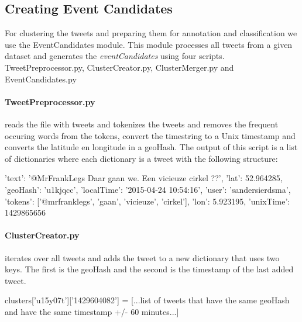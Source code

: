 \documentclass[
10pt, %
a4paper, %
oneside, %
headinclude,footinclude, %
BCOR5mm, %
]{scrartcl}
\begin{document}
\subsection{Creating Event Candidates}
For clustering the tweets and preparing them for annotation and classification we use the EventCandidates module. This module processes all tweets from a given dataset and generates the \textit{eventCandidates} using four scripts. TweetPreprocessor.py, ClusterCreator.py, ClusterMerger.py and EventCandidates.py

\paragraph{TweetPreprocessor.py}reads the file with tweets and tokenizes the tweets and removes the frequent occuring words from the tokens, convert the timestring to a Unix timestamp and converts the latitude en longitude in a geoHash. The output of this script is a list of dictionaries where each dictionary is a tweet with the following structure:

\begin{python}
{'text': '@MrFrankLegs Daar gaan we. Een vicieuze cirkel ??', 
'lat': 52.964285, 
'geoHash': 'u1kjqcc', 
'localTime': '2015-04-24 10:54:16', 
'user': 'sandersierdsma', 
'tokens': ['@mrfranklegs', 'gaan', 'vicieuze', 'cirkel'], 
'lon': 5.923195, 
'unixTime': 1429865656}
\end{python}

\paragraph{ClusterCreator.py} iterates over all tweets and adds the tweet to a new dictionary that uses two keys. The first is the geoHash and the second is the timestamp of the last added tweet.

\begin{python}
clusters['u15y07t']['1429604082'] = [...list of tweets that have the same geoHash and have the same timestamp +/- 60 minutes...]
\end{python}
\end{document}
